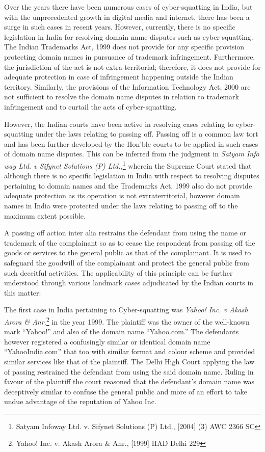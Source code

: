 \begin{multicols}{2}

\noi
Over the years there have been numerous cases of cyber-squatting in India, but with the
unprecedented growth in digital media and internet, there has been a surge in such cases in
recent years. However, currently, there is no specific legislation in India for resolving domain
name disputes such as cyber-squatting. The Indian Trademarks Act, 1999 does not provide
for any specific provision protecting domain names in pursuance of trademark infringement.
Furthermore, the jurisdiction of the act is not extra-territorial; therefore, it does not provide
for adequate protection in case of infringement happening outside the Indian territory.
Similarly, the provisions of the Information Technology Act, 2000 are not sufficient to resolve the domain name disputes in relation to trademark infringement and to curtail the acts of cyber-squatting. 

\noi
However, the Indian courts have been active in resolving cases relating to cyber-squatting
under the laws relating to passing off. Passing off is a common law tort and has been further
developed by the Hon’ble courts to be applied in such cases of domain name disputes. This
can be inferred from the judgment in \textit{Satyam Info way Ltd. v Sifynet Solutions (P) Ltd.,}\footnote{Satyam Infoway Ltd. v. Sifynet Solutions (P) Ltd., [2004] (3) AWC 2366 SC}
wherein the Supreme Court stated that although there is no specific legislation in India with
respect to resolving disputes pertaining to domain names and the Trademarks Act, 1999 also
do not provide adequate protection as its operation is not extraterritorial, however domain
names in India were protected under the laws relating to passing off to the maximum extent
possible.

\noi
A passing off action inter alia restrains the defendant from using the name or trademark of the
complainant so as to cease the respondent from passing off the goods or services to the
general public as that of the complainant. It is used to safeguard the goodwill of the
complainant and protect the general public from such deceitful activities. The applicability of
this principle can be further understood through various landmark cases adjudicated by the
Indian courts in this matter:

\noi
The first case in India pertaining to Cyber-squatting was \textit{Yahoo! Inc. v Akash Arora \& Anr.}\footnote{Yahoo! Inc. v. Akash Arora \& Anr., [1999] IIAD Delhi 229}
in the year 1999. The plaintiff was the owner of the well-known mark “Yahoo!” and also of
the domain name “Yahoo.com.” The defendants however registered a confusingly similar or
identical domain name “YahooIndia.com” that too with similar format and colour scheme
and provided similar services like that of the plaintiff. The Delhi High Court applying the law
of passing restrained the defendant from using the said domain name. Ruling in favour of the
plaintiff the court reasoned that the defendant’s domain name was deceptively similar to
confuse the general public and more of an effort to take undue advantage of the reputation of
Yahoo Inc. 


\end{multicols}
